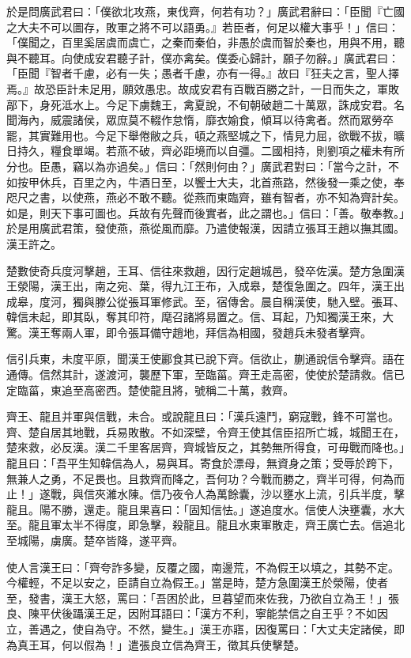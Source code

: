 \begin{pinyinscope}
於是問廣武君曰：「僕欲北攻燕，東伐齊，何若有功？」廣武君辭曰：「臣聞『亡國之大夫不可以圖存，敗軍之將不可以語勇。』若臣者，何足以權大事乎！」信曰：「僕聞之，百里奚居虞而虞亡，之秦而秦伯，非愚於虞而智於秦也，用與不用，聽與不聽耳。向使成安君聽子計，僕亦禽矣。僕委心歸計，願子勿辭。」廣武君曰：「臣聞『智者千慮，必有一失；愚者千慮，亦有一得。』故曰『狂夫之言，聖人擇焉。』故恐臣計未足用，願效愚忠。故成安君有百戰百勝之計，一日而失之，軍敗鄗下，身死泜水上。今足下虜魏王，禽夏說，不旬朝破趙二十萬眾，誅成安君。名聞海內，威震諸侯，眾庶莫不輟作怠惰，靡衣媮食，傾耳以待禽者。然而眾勞卒罷，其實難用也。今足下舉倦敝之兵，頓之燕堅城之下，情見力屈，欲戰不拔，曠日持久，糧食單竭。若燕不破，齊必距境而以自彊。二國相持，則劉項之權未有所分也。臣愚，竊以為亦過矣。」信曰：「然則何由？」廣武君對曰：「當今之計，不如按甲休兵，百里之內，牛酒日至，以饗士大夫，北首燕路，然後發一乘之使，奉咫尺之書，以使燕，燕必不敢不聽。從燕而東臨齊，雖有智者，亦不知為齊計矣。如是，則天下事可圖也。兵故有先聲而後實者，此之謂也。」信曰：「善。敬奉教。」於是用廣武君策，發使燕，燕從風而靡。乃遣使報漢，因請立張耳王趙以撫其國。漢王許之。

楚數使奇兵度河擊趙，王耳、信往來救趙，因行定趙城邑，發卒佐漢。楚方急圍漢王滎陽，漢王出，南之宛、葉，得九江王布，入成皋，楚復急圍之。四年，漢王出成皋，度河，獨與滕公從張耳軍修武。至，宿傳舍。晨自稱漢使，馳入壁。張耳、韓信未起，即其臥，奪其印符，麾召諸將易置之。信、耳起，乃知獨漢王來，大驚。漢王奪兩人軍，即令張耳備守趙地，拜信為相國，發趙兵未發者擊齊。

信引兵東，未度平原，聞漢王使酈食其已說下齊。信欲止，蒯通說信令擊齊。語在通傳。信然其計，遂渡河，襲歷下軍，至臨菑。齊王走高密，使使於楚請救。信已定臨菑，東追至高密西。楚使龍且將，號稱二十萬，救齊。

齊王、龍且并軍與信戰，未合。或說龍且曰：「漢兵遠鬥，窮寇戰，鋒不可當也。齊、楚自居其地戰，兵易敗散。不如深壁，令齊王使其信臣招所亡城，城聞王在，楚來救，必反漢。漢二千里客居齊，齊城皆反之，其勢無所得食，可毋戰而降也。」龍且曰：「吾平生知韓信為人，易與耳。寄食於漂母，無資身之策；受辱於跨下，無兼人之勇，不足畏也。且救齊而降之，吾何功？今戰而勝之，齊半可得，何為而止！」遂戰，與信夾濰水陳。信乃夜令人為萬餘囊，沙以壅水上流，引兵半度，擊龍且。陽不勝，還走。龍且果喜曰：「固知信怯。」遂追度水。信使人決壅囊，水大至。龍且軍太半不得度，即急擊，殺龍且。龍且水東軍散走，齊王廣亡去。信追北至城陽，虜廣。楚卒皆降，遂平齊。

使人言漢王曰：「齊夸詐多變，反覆之國，南邊荒，不為假王以填之，其勢不定。今權輕，不足以安之，臣請自立為假王。」當是時，楚方急圍漢王於滎陽，使者至，發書，漢王大怒，罵曰：「吾困於此，旦暮望而來佐我，乃欲自立為王！」張良、陳平伏後躡漢王足，因附耳語曰：「漢方不利，寧能禁信之自王乎？不如因立，善遇之，使自為守。不然，變生。」漢王亦寤，因復罵曰：「大丈夫定諸侯，即為真王耳，何以假為！」遣張良立信為齊王，徵其兵使擊楚。


\end{pinyinscope}
